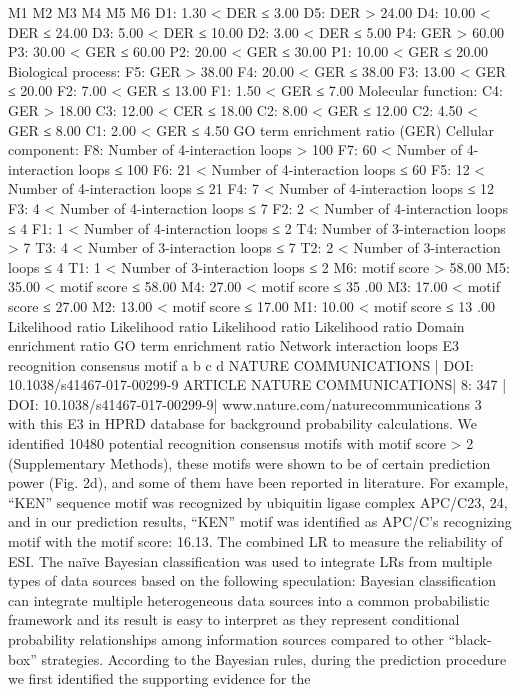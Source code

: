 M1
M2
M3
M4
M5
M6
D1: 1.30 < DER ≤ 3.00
D5: DER > 24.00
D4: 10.00 < DER ≤ 24.00
D3: 5.00 < DER ≤ 10.00
D2: 3.00 < DER ≤ 5.00
P4: GER > 60.00
P3: 30.00 < GER ≤ 60.00
P2: 20.00 < GER ≤ 30.00
P1: 10.00 < GER ≤ 20.00
Biological process:
F5: GER > 38.00
F4: 20.00 < GER ≤ 38.00
F3: 13.00 < GER ≤ 20.00
F2: 7.00 < GER ≤ 13.00
F1: 1.50 < GER ≤ 7.00
Molecular function:
C4: GER > 18.00
C3: 12.00 < CER ≤ 18.00
C2: 8.00 < GER ≤ 12.00
C2: 4.50 < GER ≤ 8.00
C1: 2.00 < GER ≤ 4.50
GO term enrichment ratio (GER)
Cellular component:
F8: Number of 4-interaction loops > 100
F7: 60 < Number of 4-interaction loops ≤ 100
F6: 21 < Number of 4-interaction loops ≤ 60
F5: 12 < Number of 4-interaction loops ≤ 21
F4: 7 < Number of 4-interaction loops ≤ 12
F3: 4 < Number of 4-interaction loops ≤ 7
F2: 2 < Number of 4-interaction loops ≤ 4
F1: 1 < Number of 4-interaction loops ≤ 2
T4: Number of 3-interaction loops > 7
T3: 4 < Number of 3-interaction loops ≤ 7
T2: 2 < Number of 3-interaction loops ≤ 4
T1: 1 < Number of 3-interaction loops ≤ 2
M6: motif score > 58.00
M5: 35.00 < motif score ≤ 58.00
M4: 27.00 < motif score ≤ 35 .00
M3: 17.00 < motif score ≤ 27.00
M2: 13.00 < motif score ≤ 17.00
M1: 10.00 < motif score ≤ 13 .00
Likelihood ratio
Likelihood ratio
Likelihood ratio
Likelihood ratio
Domain enrichment ratio
GO term enrichment ratio
Network interaction loops
E3 recognition consensus motif
a
b
c
d
NATURE COMMUNICATIONS | DOI: 10.1038/s41467-017-00299-9
ARTICLE
NATURE COMMUNICATIONS| 8:  347
| DOI: 10.1038/s41467-017-00299-9| www.nature.com/naturecommunications
3
with this E3 in HPRD database for background probability
calculations. We identiﬁed 10480 potential recognition consensus
motifs with motif score > 2 (Supplementary Methods), these
motifs were shown to be of certain prediction power (Fig. 2d),
and some of them have been reported in literature. For example,
“KEN” sequence motif was recognized by ubiquitin ligase
complex APC/C23, 24, and in our prediction results, “KEN” motif
was identiﬁed as APC/C’s recognizing motif with the motif score:
16.13.
The combined LR to measure the reliability of ESI. The naïve
Bayesian classiﬁcation was used to integrate LRs from multiple
types of data sources based on the following speculation: Bayesian
classiﬁcation can integrate multiple heterogeneous data sources
into a common probabilistic framework and its result is easy to
interpret as they represent conditional probability relationships
among information sources compared to other “black-box”
strategies. According to the Bayesian rules, during the prediction
procedure we ﬁrst identiﬁed the supporting evidence for the
